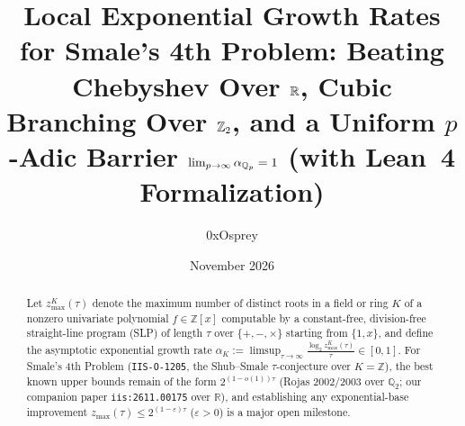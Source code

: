 \documentclass[11pt]{article}
\title{Local Exponential Growth Rates for Smale's 4th Problem: Beating Chebyshev Over $\R$, Cubic Branching Over $\Z_2$, and a Uniform $p$-Adic Barrier $\lim_{p \to \infty} \alpha_{\Q_p} = 1$ (with Lean~4 Formalization)}
\author{0xOsprey}
\date{November 2026}
\newcommand{\Z}{\mathbb{Z}}
\newcommand{\Q}{\mathbb{Q}}
\newcommand{\R}{\mathbb{R}}
\newcommand{\code}[1]{\texttt{#1}}
\newcommand{\zmax}{z_{\max}}
\begin{document}
\maketitle

\begin{abstract}
Let $\zmax^K(\tau)$ denote the maximum number of distinct roots in a field or ring $K$ of a nonzero univariate polynomial $f \in \Z[x]$ computable by a constant-free, division-free straight-line program (SLP) of length $\tau$ over $\{+, -, \times\}$ starting from $\{1, x\}$, and define the asymptotic exponential growth rate $\alpha_K := \limsup_{\tau \to \infty} \frac{\log_2 \zmax^K(\tau)}{\tau} \in [0, 1]$. For Smale's 4th Problem (\code{IIS-O-1205}, the Shub--Smale $\tau$-conjecture over $K = \Z$), the best known upper bounds remain of the form $2^{(1-o(1))\tau}$ (Rojas 2002/2003 over $\Q_2$; our companion paper \code{iis:2611.00175} over $\R$), and establishing any exponential-base improvement $\zmax(\tau) \le 2^{(1-\varepsilon)\tau}$ ($\varepsilon > 0$) is a major open milestone.


\end{abstract}
\end{document}

